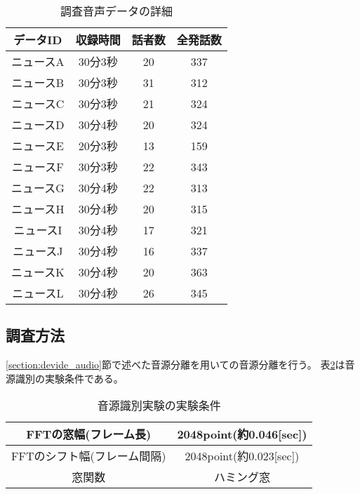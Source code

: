 \begin{table}[H]
  \begin{center}
    \caption{調査音声データの詳細　\label{table:train_detail}}
    \begin{tabular}{|c||c|c|c|} \hline
      データID & 収録時間 & 話者数 & 全発話数 \\ \hline
      ニュースA & 30分3秒 & 20 & 337 \\ \hline
      ニュースB & 30分3秒 & 31 & 312\\ \hline
      ニュースC & 30分3秒 & 21 & 324 \\ \hline
      ニュースD & 30分4秒 & 20 & 324\\ \hline
      ニュースE & 20分3秒 & 13 & 159\\ \hline
      ニュースF & 30分3秒 & 22 & 343\\ \hline
      ニュースG & 30分4秒 & 22 & 313\\ \hline
      ニュースH & 30分4秒 & 20 & 315\\ \hline
      ニュースI & 30分4秒 & 17 & 321\\ \hline
      ニュースJ & 30分4秒 & 16 & 337\\ \hline
      ニュースK & 30分4秒 & 20 & 363\\ \hline
      ニュースL & 30分4秒 & 26 & 345\\ \hline
    \end{tabular}
  \end{center}
\end{table}

\subsection{調査方法}
\ref{section:devide_audio}節で述べた音源分離を用いての音源分離を行う。
表\ref{table:detail_identification_method}は音源識別の実験条件である。

\begin{table}[H]
  \begin{center}
    \caption{音源識別実験の実験条件 \label{table:detail_identification_method}}
    \begin{tabular}{|c||c|} \hline
      FFTの窓幅(フレーム長) & 2048point(約0.046[sec])   \\ \hline
      FFTのシフト幅(フレーム間隔) &  2048point(約0.023[sec]) \\ \hline
      窓関数 & ハミング窓  \\ \hline
    \end{tabular}
  \end{center}
\end{table}

